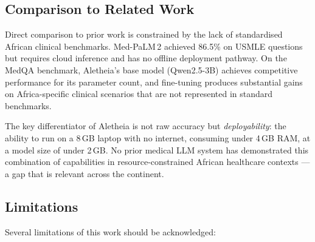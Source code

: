 \documentclass[journal]{IEEEtran}
\begin{document}
\subsection{Comparison to Related Work}

Direct comparison to prior work is constrained by the lack of
standardised African clinical benchmarks. Med-PaLM\,2
\cite{singhal2023medpalm2} achieved 86.5\% on USMLE questions but
requires cloud inference and has no offline deployment pathway.
On the MedQA benchmark, Aletheia's base model (Qwen2.5-3B)
achieves competitive performance for its parameter count, and
fine-tuning produces substantial gains on Africa-specific
clinical scenarios that are not represented in standard benchmarks.

The key differentiator of Aletheia is not raw accuracy but
\textit{deployability}: the ability to run on a 8\,GB laptop
with no internet, consuming under 4\,GB RAM, at a model size of
under 2\,GB. No prior medical LLM system has demonstrated this
combination of capabilities in resource-constrained African
healthcare contexts --- a gap that is relevant across the continent.

\subsection{Limitations}

Several limitations of this work should be acknowledged:
\end{document}
